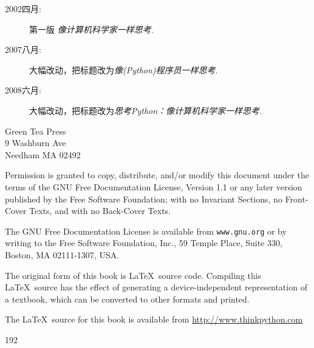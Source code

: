 \documentclass[10pt]{book}
\begin{document}
\begin{latexonly}
{\begin{description}

\item[2002四月:] 第一版 {\em 像计算机科学家一样思考}.
\item[2007八月:] 大幅改动，把标题改为{\em 像(Python)程序员一样思考}.
\item[2008六月:] 大幅改动，把标题改为{\em 思考Python：像计算机科学家一样思考}.
\end{description}

\vspace{0.2in}

\begin{flushleft}  %
Green Tea Press \\
9 Washburn Ave\\
Needham MA 02492
\end{flushleft}


Permission is granted to copy, distribute, and/or modify this document
under the terms of the GNU Free Documentation License, Version 1.1 or
any later version published by the Free Software Foundation; with no
Invariant Sections, no Front-Cover Texts, and with no Back-Cover Texts.

The GNU Free Documentation License is available from {\tt www.gnu.org}
or by writing to the Free Software Foundation, Inc., 59 Temple Place,
Suite 330, Boston, MA 02111-1307, USA.

The original form of this book is \LaTeX\ source code.  Compiling this
\LaTeX\ source has the effect of generating a device-independent
representation of a textbook, which can be converted to other formats
and printed.

The \LaTeX\ source for this book is available from
\url{http://www.thinkpython.com}
\vspace{0.2in}
}

\end{latexonly}


192
\end{document}
